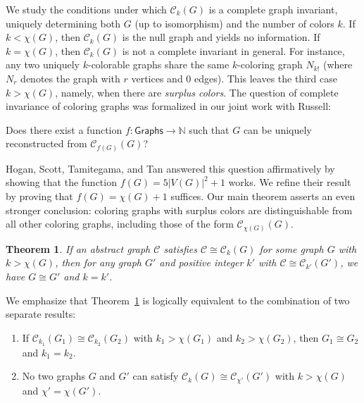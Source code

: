 \documentclass{amsart}
\theoremstyle{hypothesisstyle}
\newtheorem{theorem}{Theorem}[section]
\theoremstyle{definition}
\theoremstyle{remark}
\numberwithin{equation}{section}
\newcommand{\C}{\mathcal C}
\begin{document}
We study the conditions under which $\C_k(G)$ is a complete graph invariant, uniquely determining both $G$ (up to isomorphism) and the number of colors $k$. If $k < \chi(G)$, then $\C_k(G)$ is the null graph and yields no information. If $k=\chi(G)$, then $\C_k(G)$ is not a complete invariant in general. For instance, any two uniquely $k$-colorable graphs share the same $k$-coloring graph $N_{k!}$ (where $N_r$ denotes the graph with $r$ vertices and $0$ edges). This leaves the third case $k>\chi(G)$, namely, when there are \emph{surplus colors}. The question of complete invariance of coloring graphs was formalized in our joint work \cite{AKLR25} with Russell:

\begin{center}
Does there exist a function $f\colon \mathsf{Graphs} \to \mathbb{N}$ such that $G$ can be uniquely reconstructed from $\mathcal{C}_{f(G)}(G)$?
\end{center}

Hogan, Scott, Tamitegama, and Tan \cite{HSTT24} answered this question affirmatively by showing that the function $f(G)=5 |V(G)|^2+1$ works. We refine their result by proving that $f(G)=\chi(G)+1$ suffices. Our main theorem asserts an even stronger conclusion: coloring graphs with surplus colors are distinguishable from all other coloring graphs, including those of the form $\mathcal{C}_{\chi(G)}(G)$.

\medskip 

\begin{theorem}\label{thm:main-intro}
If an abstract graph $\mathcal{C}$ satisfies  $\C\cong\C_k(G)$ for some graph $G$ with $k>\chi(G)$, then for \emph{any} graph $G'$ and positive integer $k'$ with $\C\cong\C_{k'}(G')$, we have $G\cong G'$ and $k=k'$.
\end{theorem}

\medskip 

We emphasize that Theorem~\ref{thm:main-intro} is logically equivalent to the combination of two separate results:

\begin{enumerate}[label=(\alph*),ref=\alph*]
    \item \label{item:intro-thm-easy} If $\mathcal{C}_{k_1}(G_1) \cong \mathcal{C}_{k_2}(G_2)$ with $k_1>\chi(G_1)$ and $k_2>\chi(G_2)$, then $G_1\cong G_2$ and $k_1=k_2$. 
    \item \label{item:intro-thm-hard} No two graphs $G$ and $G'$ can satisfy $\mathcal{C}_{k}(G) \cong \mathcal{C}_{\chi'}(G')$ with $k>\chi(G)$ and $\chi'=\chi(G')$.
\end{enumerate}
\end{document}
